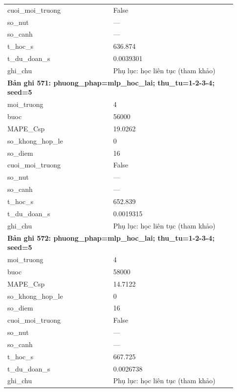 \begin{longtable}{p{0.43\linewidth}p{0.50\linewidth}}
cuoi\_\allowbreak moi\_\allowbreak truong & False \\
so\_\allowbreak nut & — \\
so\_\allowbreak canh & — \\
t\_\allowbreak hoc\_\allowbreak s & 636.874 \\
t\_\allowbreak du\_\allowbreak doan\_\allowbreak s & 0.0039301 \\
ghi\_\allowbreak chu & Phụ lục: học liên tục (tham khảo) \\
\midrule
\multicolumn{2}{p{0.95\linewidth}}{\textbf{Bản ghi 571: phuong\_phap=mlp\_hoc\_lai; thu\_tu=1-2-3-4; seed=5}} \\
moi\_\allowbreak truong & 4 \\
buoc & 56000 \\
MAPE\_\allowbreak Csp & 19.0262 \\
so\_\allowbreak khong\_\allowbreak hop\_\allowbreak le & 0 \\
so\_\allowbreak diem & 16 \\
cuoi\_\allowbreak moi\_\allowbreak truong & False \\
so\_\allowbreak nut & — \\
so\_\allowbreak canh & — \\
t\_\allowbreak hoc\_\allowbreak s & 652.839 \\
t\_\allowbreak du\_\allowbreak doan\_\allowbreak s & 0.0019315 \\
ghi\_\allowbreak chu & Phụ lục: học liên tục (tham khảo) \\
\midrule
\multicolumn{2}{p{0.95\linewidth}}{\textbf{Bản ghi 572: phuong\_phap=mlp\_hoc\_lai; thu\_tu=1-2-3-4; seed=5}} \\
moi\_\allowbreak truong & 4 \\
buoc & 58000 \\
MAPE\_\allowbreak Csp & 14.7122 \\
so\_\allowbreak khong\_\allowbreak hop\_\allowbreak le & 0 \\
so\_\allowbreak diem & 16 \\
cuoi\_\allowbreak moi\_\allowbreak truong & False \\
so\_\allowbreak nut & — \\
so\_\allowbreak canh & — \\
t\_\allowbreak hoc\_\allowbreak s & 667.725 \\
t\_\allowbreak du\_\allowbreak doan\_\allowbreak s & 0.0026738 \\
ghi\_\allowbreak chu & Phụ lục: học liên tục (tham khảo) \\

\end{longtable}
